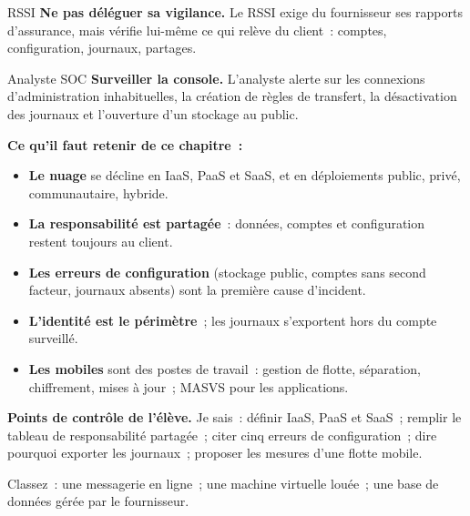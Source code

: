 \begin{boxmetier}{RSSI}
\textbf{Ne pas déléguer sa vigilance.} Le RSSI exige du fournisseur ses
rapports d'assurance, mais vérifie lui-même ce qui relève du client~:
comptes, configuration, journaux, partages.
\end{boxmetier}

\begin{boxmetier}{Analyste SOC}
\textbf{Surveiller la console.} L'analyste alerte sur les connexions
d'administration inhabituelles, la création de règles de transfert, la
désactivation des journaux et l'ouverture d'un stockage au public.
\end{boxmetier}

\separateur

\begin{boxresume}
\textbf{Ce qu'il faut retenir de ce chapitre~:}
\begin{itemize}
    \item \textbf{Le nuage} se décline en IaaS, PaaS et SaaS, et en
          déploiements public, privé, communautaire, hybride.
    \item \textbf{La responsabilité est partagée}~: données, comptes et
          configuration restent toujours au client.
    \item \textbf{Les erreurs de configuration} (stockage public, comptes
          sans second facteur, journaux absents) sont la première cause
          d'incident.
    \item \textbf{L'identité est le périmètre}~; les journaux s'exportent
          hors du compte surveillé.
    \item \textbf{Les mobiles} sont des postes de travail~: gestion de
          flotte, séparation, chiffrement, mises à jour~; MASVS pour les
          applications.
\end{itemize}
\end{boxresume}

\begin{boxinfo}
\textbf{Points de contrôle de l'élève.} Je sais~: définir IaaS, PaaS et
SaaS~; remplir le tableau de responsabilité partagée~; citer cinq erreurs
de configuration~; dire pourquoi exporter les journaux~; proposer les
mesures d'une flotte mobile.
\end{boxinfo}

\bigskip

\begin{boxexo}[title={\ding{45}\quad Exercice~20.1. Quel modèle~? \niveaubase}]
Classez~: une messagerie en ligne~; une machine virtuelle louée~; une base
de données gérée par le fournisseur.
\end{boxexo}


